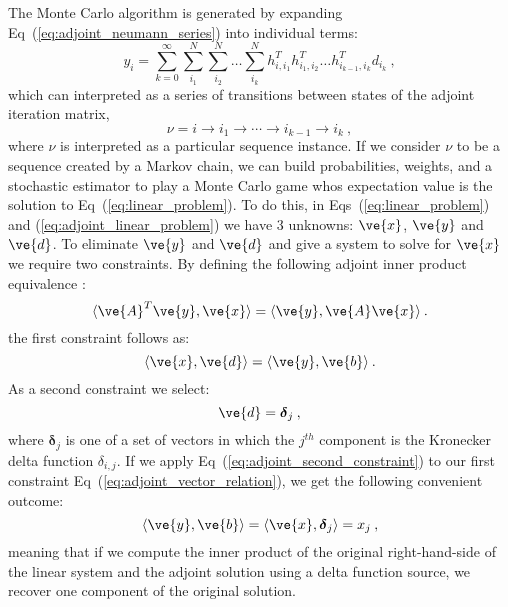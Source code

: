 \documentclass[letterpaper,11pt]{article}
\begin{document}
The Monte Carlo algorithm is generated by expanding
Eq~(\ref{eq:adjoint_neumann_series}) into individual terms:
\begin{equation}
  y_i = \sum_{k=0}^{\infty}\sum_{i_1}^{N}\sum_{i_2}^{N}\ldots
  \sum_{i_k}^{N}h^T_{i,i_1} h^T_{i_1,i_2}\ldots h^T_{i_{k-1},i_k}
  d_{i_k}\:,
  \label{eq:adjoint_neumann_solution}
\end{equation}
which can interpreted as a series of transitions between states of the 
adjoint iteration matrix,
\begin{equation}
 \nu = i \rightarrow i_1 \rightarrow \cdots \rightarrow i_{k-1}
 \rightarrow i_{k}\:,
  \label{eq:mc_walk_permutation}
\end{equation}
where $\nu$ is interpreted as a particular sequence instance. If we
consider $\nu$ to be a sequence created by a Markov chain, we can
build probabilities, weights, and a stochastic estimator to play a
Monte Carlo game whos expectation value is the solution to
Eq~(\ref{eq:linear_problem}). To do this, in
Eqs~(\ref{eq:linear_problem}) and (\ref{eq:adjoint_linear_problem}) we
have 3 unknowns: $\ve{x}$, $\ve{y}$ and $\ve{d}$. To eliminate
$\ve{y}$ and $\ve{d}$ and give a system to solve for $\ve{x}$ we
require two constraints. By defining the following adjoint inner
product equivalence \cite{spanier_monte_1969}:
\begin{equation}
  \langle \ve{A}^T \ve{y}, \ve{x} \rangle = \langle \ve{y}, \ve{A}
  \ve{x} \rangle\:.
  \label{eq:adjoint_operator_product}
\end{equation}
the first constraint follows as:
\begin{equation}
  \langle \ve{x}, \ve{d} \rangle = \langle \ve{y}, \ve{b} \rangle\:.
  \label{eq:adjoint_vector_relation}
\end{equation}
As a second constraint we select:
\begin{equation}
  \ve{d} = \boldsymbol{\delta}_j\:,
  \label{eq:adjoint_second_constraint}
\end{equation}
where $\boldsymbol{\delta}_j$ is one of a set of vectors in which the
$j^{th}$ component is the Kronecker delta function $\delta_{i,j}$. If
we apply Eq~(\ref{eq:adjoint_second_constraint}) to our first
constraint Eq~(\ref{eq:adjoint_vector_relation}), we get the following
convenient outcome:
\begin{equation}
  \langle \ve{y}, \ve{b} \rangle = \langle \ve{x},
  \boldsymbol{\delta}_j \rangle = x_j \:,
  \label{eq:inner_product_constraint}
\end{equation}
meaning that if we compute the inner product of the original
right-hand-side of the linear system and the adjoint solution using a
delta function source, we recover one component of the original
solution.
\end{document}
